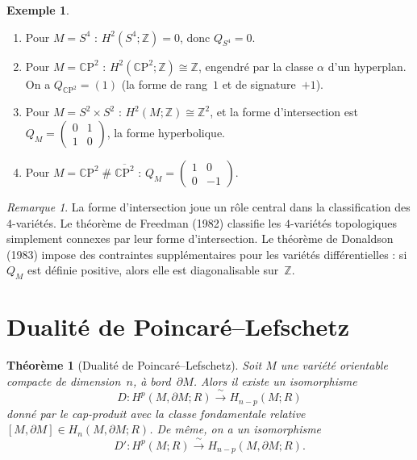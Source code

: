 \documentclass[12pt,a4paper,openany]{book}
\theoremstyle{definition}
\newtheorem{exemple}[definition]{Exemple}
\theoremstyle{plain}
\newtheorem{theoreme}[definition]{Théorème}
\theoremstyle{remark}
\newtheorem{remarque}[definition]{Remarque}
\newcommand{\Z}{\mathbb{Z}}
\newcommand{\CP}{\mathbb{C}\mathrm{P}}
\begin{document}
\begin{exemple}\label{ex:formes-intersection}
  \begin{enumerate}[label=(\roman*)]
    \item Pour $M = S^4$ : $H^2(S^4; \Z) = 0$, donc $Q_{S^4} = 0$.
    \item Pour $M = \CP^2$ : $H^2(\CP^2; \Z) \cong \Z$, engendré par la classe
          $\alpha$ d'un hyperplan. On a $Q_{\CP^2} = (1)$ (la forme de rang~$1$
          et de signature~$+1$).
    \item Pour $M = S^2 \times S^2$ : $H^2(M; \Z) \cong \Z^2$, et la forme
          d'intersection est $Q_M = \begin{pmatrix} 0 & 1 \\ 1 & 0 \end{pmatrix}$,
          la forme hyperbolique.
    \item Pour $M = \CP^2 \mathbin{\#} \overline{\CP^2}$ :
          $Q_M = \begin{pmatrix} 1 & 0 \\ 0 & -1 \end{pmatrix}$.
  \end{enumerate}
\end{exemple}

\begin{remarque}\label{rem:donaldson-freedman}
  La forme d'intersection joue un rôle central dans la classification des
  $4$-variétés. Le théorème de Freedman (1982) classifie les $4$-variétés topologiques
  simplement connexes par leur forme d'intersection. Le théorème de Donaldson (1983)
  impose des contraintes supplémentaires pour les variétés différentielles : si
  $Q_M$ est définie positive, alors elle est diagonalisable sur~$\Z$.
\end{remarque}


\section{Dualité de Poincaré--Lefschetz}\label{sec:poincare-lefschetz}

\begin{theoreme}[Dualité de Poincaré--Lefschetz]\label{thm:poincare-lefschetz}
  Soit $M$ une variété orientable compacte de dimension~$n$, à bord~$\partial M$.
  Alors il existe un isomorphisme
  \[
    D \colon H^p(M, \partial M; R) \xrightarrow{\;\sim\;} H_{n-p}(M; R)
  \]
  donné par le cap-produit avec la classe fondamentale relative
  $[M, \partial M] \in H_n(M, \partial M; R)$. De même, on a un isomorphisme
  \[
    D' \colon H^p(M; R) \xrightarrow{\;\sim\;} H_{n-p}(M, \partial M; R).
  \]
\end{theoreme}
\end{document}
